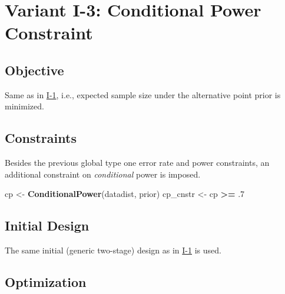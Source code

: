 \documentclass[]{book}
\newenvironment{Shaded}{\begin{snugshade}}{\end{snugshade}}
\newcommand{\FloatTok}[1]{\textcolor[rgb]{0.00,0.00,0.81}{#1}}
\newcommand{\KeywordTok}[1]{\textcolor[rgb]{0.13,0.29,0.53}{\textbf{#1}}}
\newcommand{\NormalTok}[1]{#1}
\newcommand{\OperatorTok}[1]{\textcolor[rgb]{0.81,0.36,0.00}{\textbf{#1}}}
\newcommand{\StringTok}[1]{\textcolor[rgb]{0.31,0.60,0.02}{#1}}
\begin{document}
\hypertarget{variantI_3}{%
\section{Variant I-3: Conditional Power Constraint}\label{variantI_3}}

\hypertarget{objective-2}{%
\subsection{Objective}\label{objective-2}}

Same as in \protect\hyperlink{variantI_1}{I-1}, i.e., expected sample size under the
alternative point prior is minimized.

\hypertarget{constraints-2}{%
\subsection{Constraints}\label{constraints-2}}

Besides the previous global type one error rate and power constraints,
an additional constraint on \emph{conditional} power is imposed.

\begin{Shaded}
\begin{Highlighting}[]
\NormalTok{cp       <-}\StringTok{ }\KeywordTok{ConditionalPower}\NormalTok{(datadist, prior)}
\NormalTok{cp_cnstr <-}\StringTok{ }\NormalTok{cp }\OperatorTok{>=}\StringTok{ }\FloatTok{.7}
\end{Highlighting}
\end{Shaded}

\hypertarget{initial-design-1}{%
\subsection{Initial Design}\label{initial-design-1}}

The same initial (generic two-stage) design as in \protect\hyperlink{variantI_1}{I-1} is used.

\hypertarget{optimization-2}{%
\subsection{Optimization}\label{optimization-2}}
\end{document}

